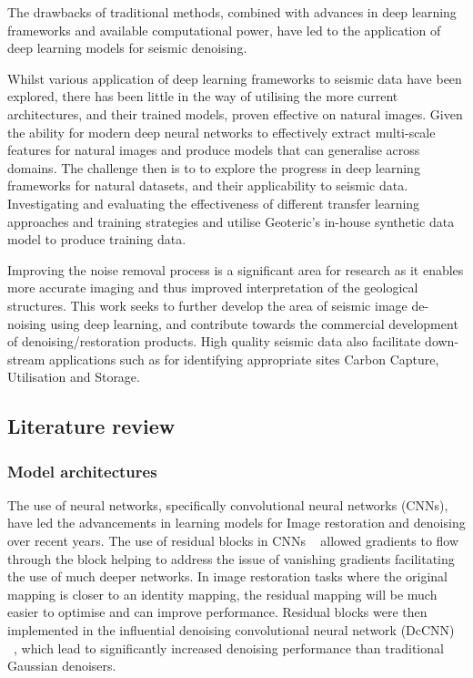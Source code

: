 \documentclass[project-plan]{report-template}
\begin{document}
The drawbacks of traditional methods, combined with advances in deep learning frameworks and available computational power, have led to the application of deep learning models for seismic denoising.

Whilst various application of deep learning frameworks to seismic data have been explored, there has been little in the way of utilising the more current architectures, and their trained models, proven effective on natural images. Given the ability for modern deep neural networks to effectively extract multi-scale features for natural images and produce models that can generalise across domains. The challenge then is to to explore the progress in deep learning frameworks for natural datasets, and their applicability to seismic data. Investigating and evaluating the effectiveness of different transfer learning approaches and training strategies and utilise Geoteric's in-house synthetic data model to produce training data.

Improving the noise removal process is a significant area for research as it enables more accurate imaging and thus improved interpretation of the geological structures. This work seeks to further develop the area of seismic image de-noising using deep learning, and contribute towards the commercial development of denoising/restoration products. High quality seismic data also facilitate down-stream applications such as for identifying appropriate sites Carbon Capture, Utilisation and Storage.

\subsection{Literature review}
\subsubsection{Model architectures}
The use of neural networks, specifically convolutional neural networks (CNNs), have led the advancements in learning models for Image restoration and denoising over recent years. The use of residual blocks in CNNs ~\cite{he2015DeepRL} allowed gradients to flow through the block helping to address the issue of vanishing gradients facilitating the use of much deeper networks. In image restoration tasks where the original mapping is closer to an identity mapping, the residual mapping will be much easier to optimise and can improve performance. Residual blocks were then implemented in the influential denoising convolutional neural network (DcCNN) ~\cite{zhang2017beyond}, which lead to significantly increased denoising performance than traditional Gaussian denoisers. 
\end{document}
